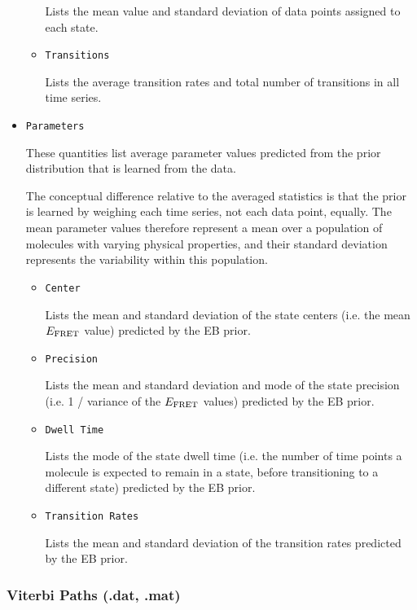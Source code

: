 \documentclass[12pt,article,oldfontcommands]{memoir}
\begin{document}
\begin{itemize}
\begin{itemize}
Lists the mean value and standard deviation of data points assigned to each state.

\item \texttt{Transitions}

Lists the average transition rates and total number of transitions in all time series.
\end{itemize}


\item \texttt{Parameters}

These quantities list average parameter values predicted from the prior distribution that is learned from the data. 

The conceptual difference relative to the averaged statistics is that the prior is learned by weighing each time series, not each data point, equally. The mean parameter values therefore represent a mean over a population of molecules with varying physical properties, and their standard deviation represents the variability within this population.

\begin{itemize}
\item \texttt{Center}

Lists the mean and standard deviation of the state centers (i.e. the mean $E_{\rm FRET}$ value) predicted by the EB prior.

\item \texttt{Precision}

Lists the mean and standard deviation and mode of the state precision (i.e. 1 / variance of the $E_{\rm FRET}$ values) predicted by the EB prior.

\item \texttt{Dwell Time}

Lists the mode of the state dwell time (i.e. the number of time points a molecule is expected to remain in a state, before transitioning to a different state) predicted by the EB prior.

\item \texttt{Transition Rates}

Lists the mean and standard deviation of the transition rates predicted by the EB prior.


\end{itemize}

\end{itemize}


\subsubsection{Viterbi Paths (.dat, .mat)}
\end{document}

